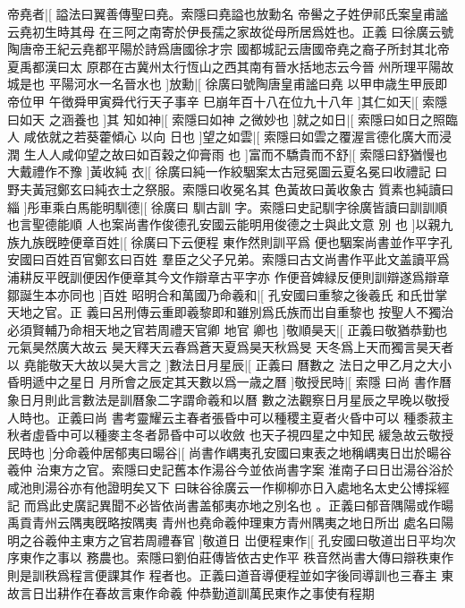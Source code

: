 帝堯者|[%
謚法曰翼善傳聖曰堯。索隱曰堯謚也放勳名%
帝嚳之子姓伊祁氏案皇甫謐云堯初生時其母%
%
在三阿之南寄於伊長孺之家故從母所居爲姓也。正義%
曰徐廣云號陶唐帝王紀云堯都平陽於詩爲唐國徐才宗%
%
國都城記云唐國帝堯之裔子所封其北帝夏禹都漢曰太%
原郡在古冀州太行恆山之西其南有晉水括地志云今晉%
%
州所理平陽故城是也%
平陽河水一名晉水也%
]放勳|[%
徐廣曰號陶唐皇甫謐曰堯%
以甲申歳生甲辰即帝位甲%
%
午徴舜甲寅舜代行天子事辛%
巳崩年百十八在位九十八年%
]其仁如天|[%
索隱曰如天%
之涵養也%
]其%
%
知如神|[%
索隱曰如神%
之微妙也%
]就之如日|[%
索隱曰如日之照臨人%
咸依就之若葵藿傾心%
%
以向%
日也%
]望之如雲|[%
索隱曰如雲之覆渥言德化廣大而浸潤%
生人人咸仰望之故曰如百穀之仰膏雨%
%
也%
]富而不驕貴而不舒|[%
索隱曰舒猶慢也%
大戴禮作不豫%
]黃收純%
%
衣|[%
徐廣曰純一作絞駰案太古冠冕圖云夏名冕曰收禮記%
曰野夫黃冠鄭玄曰純衣士之祭服。索隱曰收冕名其%
色黃故曰黃收象古%
質素也純讀曰緇%
]彤車乘白馬能明馴德|[%
徐廣曰%
馴古訓%
%
字。索隱曰史記馴字徐廣皆讀曰訓訓順也言聖德能順%
人也案尚書作俊德孔安國云能明用俊德之士與此文意%
%
別%
也%
]以親九族九族旣睦便章百姓|[%
徐廣曰下云便程%
東作然則訓平爲%
%
便也駰案尚書並作平字孔安國曰百姓百官鄭玄曰百姓%
羣臣之父子兄弟。索隱曰古文尚書作平此文盖讀平爲%
%
浦耕反平旣訓便因作便章其今文作辯章古平字亦%
作便音婢緑反便則訓辯遂爲辯章鄒誕生本亦同也%
]百姓%
%
昭明合和萬國乃命羲和|[%
孔安國曰重黎之後羲氏%
和氏丗掌天地之官。正%
%
義曰呂刑傳云重即羲黎即和雖別爲氏族而岀自重黎也%
按聖人不獨治必須賢輔乃命相天地之官若周禮天官卿%
%
地官%
卿也%
]敬順昊天|[%
正義曰敬猶恭勤也元氣昊然廣大故云%
昊天釋天云春爲蒼天夏爲昊天秋爲旻%
%
天冬爲上天而獨言昊天者以%
堯能敬天大故以昊大言之%
]數法日月星辰|[%
正義曰%
曆數之%
%
法日之甲乙月之大小昏明遞中之星日%
月所會之辰定其天數以爲一歳之曆%
]敬授民時|[%
索隱%
曰尚%
%
書作曆象日月則此言數法是訓曆象二字謂命羲和以曆%
數之法觀察日月星辰之早晚以敬授人時也。正義曰尚%
%
書考靈耀云主春者張昏中可以種稷主夏者火昏中可以%
種黍菽主秋者虛昏中可以種麥主冬者昴昏中可以收斂%
%
也天子視四星之中知民%
緩急故云敬授民時也%
]分命羲仲居郁夷曰暘谷|[%
%
尚書作嵎夷孔安國曰東表之地稱嵎夷日岀於暘谷羲仲%
治東方之官。索隱曰史記舊本作湯谷今並依尚書字案%
%
淮南子曰日岀湯谷浴於咸池則湯谷亦有他證明矣又下%
曰昧谷徐廣云一作柳柳亦日入處地名太史公博採經記%
%
而爲此史廣記異聞不必皆依尚書盖郁夷亦地之別名也%
。正義曰郁音隅陽或作暘禹貢青州云隅夷旣略按隅夷%
%
青州也堯命羲仲理東方青州隅夷之地日所岀%
處名曰陽明之谷羲仲主東方之官若周禮春官%
]敬道日%
%
岀便程東作|[%
孔安國曰敬道岀日平均次序東作之事以%
務農也。索隱曰劉伯莊傳皆依古史作平%
%
秩音然尚書大傳曰辯秩東作則是訓秩爲程言便課其作%
程者也。正義曰道音導便程並如字後同導訓也三春主%
%
東故言日岀耕作在春故言東作命羲%
仲恭勤道訓萬民東作之事使有程期%

